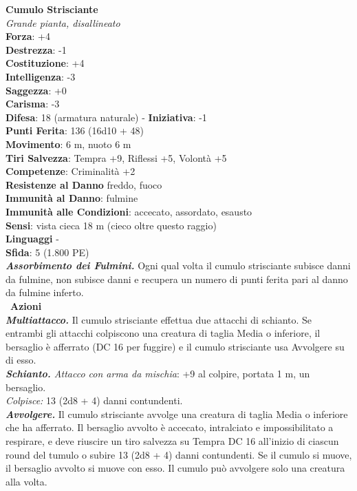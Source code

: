 \begin{multicols}{2}
\medskip\textbf{Cumulo Strisciante}\\
\emph{Grande pianta, disallineato}\\
\textbf{Forza}: +4\\
\textbf{Destrezza}: -1\\
\textbf{Costituzione}: +4\\
\textbf{Intelligenza}: -3\\
\textbf{Saggezza}: +0\\
\textbf{Carisma}: -3\\
\textbf{Difesa}: 18 (armatura naturale) - \textbf{Iniziativa}: -1\\
\textbf{Punti Ferita}: 136 (16d10 + 48)\\
\textbf{Movimento}: 6 m, nuoto 6 m\\
\textbf{Tiri Salvezza}: Tempra +9, Riflessi +5, Volontà +5\\
\textbf{Competenze}: Criminalità +2\\
\textbf{Resistenze al Danno} freddo, fuoco\\
\textbf{Immunità al Danno}: fulmine\\
\textbf{Immunità alle Condizioni}: accecato, assordato, esausto\\
\textbf{Sensi}: vista cieca 18 m (cieco oltre questo raggio)\\
\textbf{Linguaggi} -\\
\textbf{Sfida}: 5 (1.800 PE)\smallskip\\
\emph{\textbf{Assorbimento dei Fulmini.}} Ogni qual volta il cumulo strisciante subisce danni da fulmine, non subisce danni e recupera un numero di punti ferita pari al danno da fulmine inferto.\\\
\smallskip\textbf{Azioni}\\
\emph{\textbf{Multiattacco.}} Il cumulo strisciante effettua due attacchi di schianto. Se entrambi gli attacchi colpiscono una creatura di taglia Media o inferiore, il bersaglio è afferrato (DC  16 per fuggire) e il cumulo strisciante usa Avvolgere su di esso.\\
\emph{\textbf{Schianto.} Attacco con arma da mischia}: +9 al colpire, portata 1 m, un bersaglio.\\
\emph{Colpisce:} 13 (2d8 + 4) danni contundenti.\\
\emph{\textbf{Avvolgere.}} Il cumulo strisciante avvolge una creatura di taglia Media o inferiore che ha afferrato. Il bersaglio avvolto è accecato, intralciato e impossibilitato a respirare, e deve riuscire un tiro salvezza su Tempra DC  16 all'inizio di ciascun round del tumulo o subire 13 (2d8 + 4) danni contundenti. Se il cumulo si muove, il bersaglio avvolto si muove con esso. Il cumulo può avvolgere solo una creatura alla volta.\\

\end{multicols}
